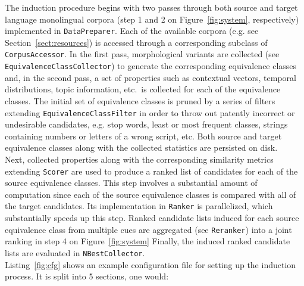 \documentclass{article}
\newcommand{\secref}[1]{Section~\ref{#1}}
\newcommand{\figref}[1]{Figure~\ref{#1}}
\newcommand{\lstref}[1]{Listing~\ref{#1}}
\begin{document}
The induction procedure begins with two passes through both source and target language monolingual corpora (step 1 and 2 on \figref{fig:system}, respectively) implemented in \small{\tt DataPreparer}.  Each of the available corpora (e.g. see \secref{sect:resources}) is accessed through a corresponding subclass of \small{\tt CorpusAccessor}.  In the first pass, morphological variants are collected (see \small{\tt EquivalenceClassCollector}) to generate the corresponding equivalence classes and, in the second pass, a set of properties such as contextual vectors, temporal distributions, topic information, etc.\ is collected for each of the equivalence classes. The initial set of equivalence classes is pruned by a series of filters extending \small{\tt EquivalenceClassFilter} in order to throw out patently incorrect or undesirable candidates, e.g. stop words, least or most frequent classes, strings containing numbers or letters of a wrong script, etc. Both source and target equivalence classes along with the collected statistics are persisted on disk.\\

Next, collected properties along with the corresponding similarity metrics extending \small{\tt Scorer} are used to produce a ranked list of candidates for each of the source equivalence classes.  This step involves a substantial amount of computation since each of the source equivalence classes is compared with all of the target candidates. Its implementation in \small{\tt Ranker} is parallelized, which substantially speeds up this step.  Ranked candidate lists induced for each source equivalence class from multiple cues are aggregated (see \small{\tt Reranker}) into a joint ranking in step 4 on \figref{fig:system}  Finally, the induced ranked candidate lists are evaluated in \small{\tt NBestCollector}.\\

\lstref{fig:cfg} shows an example configuration file for setting up the induction process.  It is split into 5 sections, one would:
\end{document}
